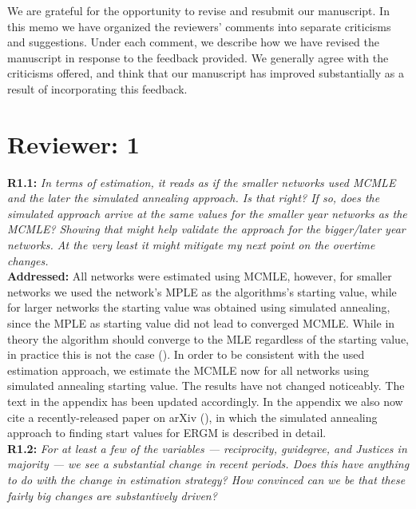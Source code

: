 \documentclass[a4paper,11pt]{texMemo}
\begin{document}
\maketitle

\noindent We are grateful for the opportunity to revise and resubmit our manuscript. In this memo
we have organized the reviewers' comments into separate criticisms and
suggestions. Under each comment, we describe how we have revised the manuscript in
response to the feedback provided. We generally agree with the criticisms offered, and think
that our manuscript has improved substantially as a result of incorporating this feedback. 



\section*{Reviewer: 1}

\noindent \textbf{R1.1:} \emph{ In terms of estimation, it reads as if the smaller networks used MCMLE and the later the simulated annealing approach. Is that right? If so, does the simulated approach arrive at the same values for the smaller year networks as the MCMLE? Showing that might help validate the approach for the bigger/later year networks. At the very least it might mitigate my next point on the overtime changes.   }\\

\noindent \textbf{Addressed:} All networks were estimated using MCMLE, however, for smaller networks we used the network's MPLE as the algorithms's starting value, while for larger networks the starting value was obtained using simulated annealing, since the MPLE as starting value did not lead to converged MCMLE. While in theory the algorithm should converge to the MLE regardless of the starting value, in practice this is not the case   (\cite{hummel2012improving}). 
In order to be consistent with the used estimation approach, we estimate the MCMLE now for all networks using simulated annealing starting value. The results have not changed noticeably. 
The text in the appendix has been updated accordingly. In the appendix we also now cite a recently-released paper on arXiv (\cite{SchmidHunter2020}), in which the simulated annealing approach to finding start values for ERGM is described in detail. \\

\noindent  \textbf{R1.2:} \emph{ For at least a few of the variables --- reciprocity, gwidegree, and Justices in majority --- we see a substantial change in recent periods. Does this have anything to do with the change in estimation strategy? How convinced can we be that these fairly big changes are substantively driven? }\\
\end{document}
